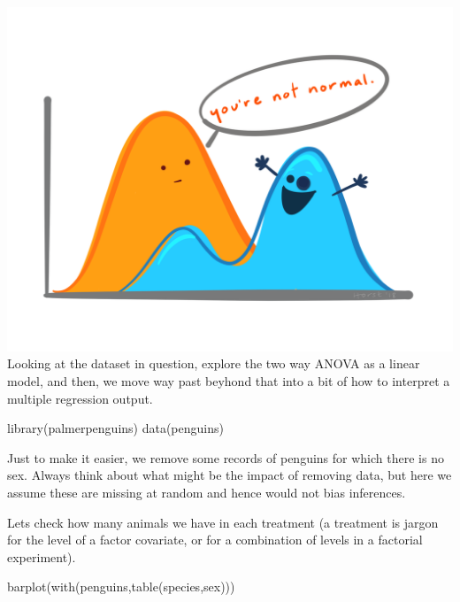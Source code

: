 \documentclass[
]{book}
\newenvironment{Shaded}{\begin{snugshade}}{\end{snugshade}}
\newcommand{\FunctionTok}[1]{\textcolor[rgb]{0.00,0.00,0.00}{#1}}
\newcommand{\NormalTok}[1]{#1}
\newcommand{\OtherTok}[1]{\textcolor[rgb]{0.56,0.35,0.01}{#1}}
\newcommand{\SpecialCharTok}[1]{\textcolor[rgb]{0.00,0.00,0.00}{#1}}
\begin{document}
\includegraphics{extfiles/not_normal.png}
Looking at the dataset in question, explore the two way ANOVA as a linear model, and then, we move way past beyhond that into a bit of how to interpret a multiple regression output.

\begin{Shaded}
\begin{Highlighting}[]
\FunctionTok{library}\NormalTok{(palmerpenguins)}
\FunctionTok{data}\NormalTok{(penguins)}
\end{Highlighting}
\end{Shaded}

Just to make it easier, we remove some records of penguins for which there is no sex. Always think about what might be the impact of removing data, but here we assume these are missing at random and hence would not bias inferences.

\begin{Shaded}
\end{Shaded}

Lets check how many animals we have in each treatment (a treatment is jargon for the level of a factor covariate, or for a combination of levels in a factorial experiment).

\begin{Shaded}
\begin{Highlighting}[]
\FunctionTok{barplot}\NormalTok{(}\FunctionTok{with}\NormalTok{(penguins,}\FunctionTok{table}\NormalTok{(species,sex)))}
\end{Highlighting}
\end{Shaded}
\end{document}
